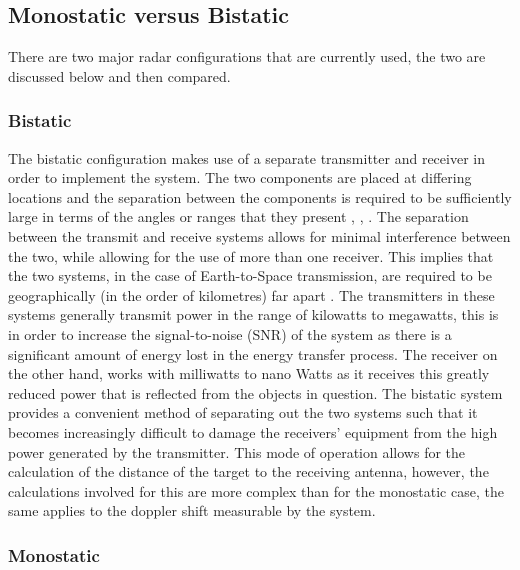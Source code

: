 \documentclass[11pt]{witseiepaper}
\begin{document}
\subsection{Monostatic versus Bistatic} \label{sec:MonostaticvsBistatic}

There are two major radar configurations that are currently used, the two are discussed below and then compared.

\subsubsection{Bistatic} \label{sec:Bistatic}

The bistatic configuration makes use of a separate transmitter and receiver in order to implement the system. The two components are placed at differing locations and the separation between the components is required to be sufficiently large in terms of the angles or ranges that they present \cite{OrbitDetermination}, \cite[p.~5]{technicalReportSpaceDebris}, \cite[p.~3]{elevationLoss}. The separation between the transmit and receive systems allows for minimal interference between the two, while allowing for the use of more than one receiver.
This implies that the two systems, in the case of Earth-to-Space transmission, are required to be geographically (in the order of kilometres) far apart \cite{bistaticNato}.
The transmitters in these systems generally transmit power in the range of kilowatts to megawatts, this is in order to increase the signal-to-noise (SNR) of the system as there is a significant amount of energy lost in the energy transfer process. The receiver on the other hand, works with milliwatts to nano Watts as it receives this greatly reduced power that is reflected from the objects in question. The bistatic system provides a convenient method of separating out the two systems such that it becomes increasingly difficult to damage the receivers' equipment from the high power generated by the transmitter.
This mode of operation allows for the calculation of the distance of the target to the receiving antenna, however, the calculations involved for this are more complex than for the monostatic case, the same applies to the doppler shift measurable by the system.

\subsubsection{Monostatic} \label{sec:Monostatic}
\end{document}
